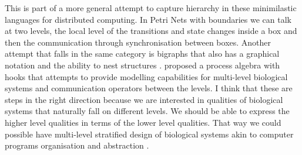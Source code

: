 This is part of a more general attempt to capture hierarchy in
these minimilastic languages for distributed computing. In Petri Nets
with boundaries we can talk at two levels, the local level of the
transitions and state changes inside a box and then the communication
through synchronisation between boxes. Another attempt that falls in
the same category is bigraphs that also has a graphical notation and
the ability to nest structures \cite []
{jensen2004bigraphs}. \citet{degasperi2013process} proposed a process
algebra with hooks that attempts to provide modelling capabilities for
multi-level biological systems and communication operators between the
levels. I think that these are steps in the right direction because we
are interested in qualities of biological systems that naturally fall
on different levels. We should be able to express the higher level
qualities in terms of the lower level qualities. That way we could
possible have multi-level stratified design of biological systems akin
to computer programs organisation and abstraction \cite [] {abelson1987lisp}.

